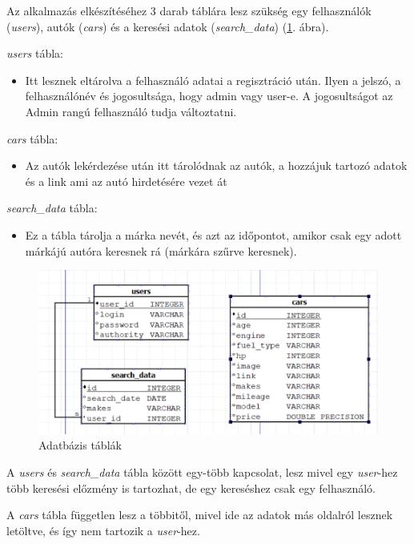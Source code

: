 
Az alkalmazás elkészítéséhez 3 darab táblára lesz szükség egy
felhasználók (\textit{users}), autók (\textit{cars}) és a keresési adatok (\textit{search\_data}) (\ref{fig:DataTable}. ábra).

\textit{users} tábla:
\begin{itemize}
\item Itt lesznek eltárolva a felhasználó adatai a regisztráció után. Ilyen a jelszó, a felhasználónév és jogosultsága, hogy admin vagy user-e. A jogosultságot az Admin rangú felhasználó tudja változtatni.
\end{itemize}

\textit{cars} tábla:
\begin{itemize}
\item Az autók lekérdezése után itt tárolódnak az autók,  a hozzájuk tartozó adatok és a link ami az autó hirdetésére vezet át
\end{itemize}

\textit{search\_data} tábla:
\begin{itemize}
\item Ez a tábla tárolja a márka nevét, és azt az időpontot, amikor csak egy adott márkájú autóra keresnek rá (márkára szűrve keresnek).
\end{itemize}
 
 \begin{figure}[h]
\centering
\includegraphics[scale=0.6]{images/Data_Table.png}
\caption{Adatbázis táblák}
\label{fig:DataTable}
\end{figure}

A \textit{users} és \textit{search\_data} tábla között egy-több kapcsolat, lesz mivel egy \textit{user}-hez több keresési előzmény is tartozhat, de egy kereséshez csak egy felhasználó.

A \textit{cars} tábla független lesz a többitől, mivel ide az adatok más oldalról lesznek letöltve, és így nem tartozik a \textit{user}-hez.

